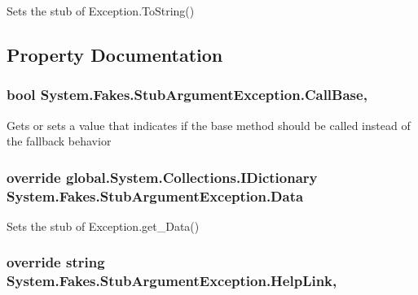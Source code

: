 Sets the stub of Exception.\-To\-String()



\subsection{Property Documentation}
\hypertarget{class_system_1_1_fakes_1_1_stub_argument_exception_a6e9c054404e33a6fd3c5bb883dece5c8}{
\subsubsection[{Call\-Base}]{\setlength{\rightskip}{0pt plus 5cm}bool System.\-Fakes.\-Stub\-Argument\-Exception.\-Call\-Base\hspace{0.3cm}{\ttfamily [get]}, {\ttfamily [set]}}}\label{class_system_1_1_fakes_1_1_stub_argument_exception_a6e9c054404e33a6fd3c5bb883dece5c8}


Gets or sets a value that indicates if the base method should be called instead of the fallback behavior

\hypertarget{class_system_1_1_fakes_1_1_stub_argument_exception_a6b8d56ad6ac0e7c051817d6a13a17114}{
\subsubsection[{Data}]{\setlength{\rightskip}{0pt plus 5cm}override global.\-System.\-Collections.\-I\-Dictionary System.\-Fakes.\-Stub\-Argument\-Exception.\-Data\hspace{0.3cm}{\ttfamily [get]}}}\label{class_system_1_1_fakes_1_1_stub_argument_exception_a6b8d56ad6ac0e7c051817d6a13a17114}


Sets the stub of Exception.\-get\-\_\-\-Data()

\hypertarget{class_system_1_1_fakes_1_1_stub_argument_exception_ae588834a0bea95d1d47c2adc41e31115}{
\subsubsection[{Help\-Link}]{\setlength{\rightskip}{0pt plus 5cm}override string System.\-Fakes.\-Stub\-Argument\-Exception.\-Help\-Link\hspace{0.3cm}{\ttfamily [get]}, {\ttfamily [set]}}}\label{class_system_1_1_fakes_1_1_stub_argument_exception_ae588834a0bea95d1d47c2adc41e31115}


